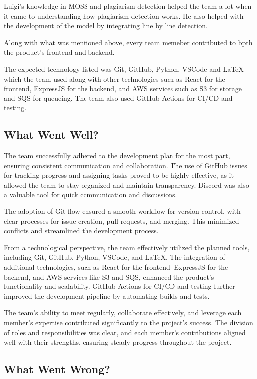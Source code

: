 \documentclass{article}
\begin{document}
Luigi's knowledge in MOSS and plagiarism detection helped the team a lot when it came to understanding how plagiarism detection works.
He also helped with the development of the model by integrating line by line detection.

Along with what was mentioned above, every team memeber contributed to bpth the product's frontend and backend.

The expected technology listed was Git, GitHub, Python, VSCode and LaTeX which the team used along 
with other technologies such as React for the frontend, ExpressJS for the backend, and AWS services 
such as S3 for storage and SQS for queueing. The team also used GitHub Actions for CI/CD and testing.


\subsection{What Went Well?}

The team successfully adhered to the development plan for the most part, ensuring consistent communication and collaboration. The use of GitHub issues for tracking progress and assigning tasks proved to be highly effective, as it allowed the team to stay organized and maintain transparency. Discord was also a valuable tool for quick communication and discussions.

The adoption of Git flow ensured a smooth workflow for version control, with clear processes for issue creation, pull requests, and merging. This minimized conflicts and streamlined the development process.

From a technological perspective, the team effectively utilized the planned tools, including Git, GitHub, Python, VSCode, and LaTeX. The integration of additional technologies, such as React for the frontend, ExpressJS for the backend, and AWS services like S3 and SQS, enhanced the product's functionality and scalability. GitHub Actions for CI/CD and testing further improved the development pipeline by automating builds and tests.

The team's ability to meet regularly, collaborate effectively, and leverage each member's expertise contributed significantly to the project's success. The division of roles and responsibilities was clear, and each member's contributions aligned well with their strengths, ensuring steady progress throughout the project.

\subsection{What Went Wrong?}
\end{document}
